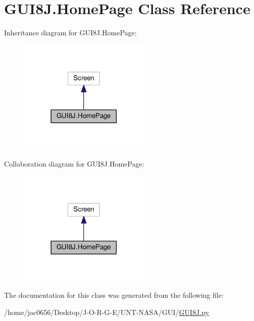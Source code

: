 \hypertarget{classGUI8J_1_1HomePage}{}\section{G\+U\+I8\+J.\+Home\+Page Class Reference}
\label{classGUI8J_1_1HomePage}


Inheritance diagram for G\+U\+I8\+J.\+Home\+Page\+:\nopagebreak
\begin{figure}[H]
\begin{center}
\leavevmode
\includegraphics[width=177pt]{classGUI8J_1_1HomePage__inherit__graph}
\end{center}
\end{figure}


Collaboration diagram for G\+U\+I8\+J.\+Home\+Page\+:\nopagebreak
\begin{figure}[H]
\begin{center}
\leavevmode
\includegraphics[width=177pt]{classGUI8J_1_1HomePage__coll__graph}
\end{center}
\end{figure}


The documentation for this class was generated from the following file\+:\begin{DoxyCompactItemize}
\item 
/home/jac0656/\+Desktop/\+J-\/\+O-\/\+R-\/\+G-\/\+E/\+U\+N\+T-\/\+N\+A\+S\+A/\+G\+U\+I/\hyperlink{GUI8J_8py}{G\+U\+I8\+J.\+py}\end{DoxyCompactItemize}
